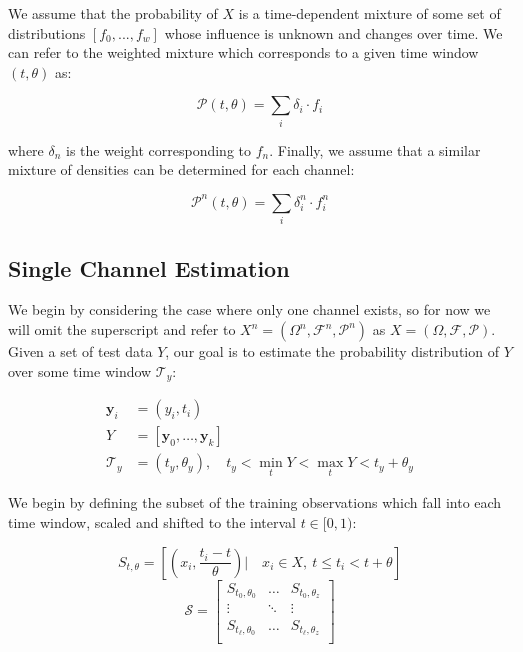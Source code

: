 \documentclass[10pt]{article}
\begin{document}
We assume that the probability of \(X \) is a time-dependent mixture of some set of distributions \( [f_0,...,f_w] \) whose influence is unknown and changes over time.  We can refer to the weighted mixture which corresponds to a given time window \( (t,\theta) \) as:

\begin{equation} \mathcal{P}(t,\theta) = \sum_i \delta_i \cdot f_i \end{equation}

where \( \delta_n \) is the weight corresponding to \( f_n \).  Finally, we assume that a similar mixture of densities can be determined for each channel:

\begin{equation} \mathcal{P}^n(t,\theta) = \sum_i \delta_i^n \cdot f_i^n \end{equation}

\subsection{Single Channel Estimation}
We begin by considering the case where only one channel exists, so for now we will omit the superscript and refer to \(X^n = (\Omega^n,\mathcal{F}^n,\mathcal{P}^n) \) as \(X = (\Omega, \mathcal{F},\mathcal{P}) \).  Given a set of test data \( Y \), our goal is to estimate the probability distribution of \( Y \) over some time window \( \mathcal{T}_y \):

\begin{align*}
\mathbf{y}_i &= (y_i,t_i) \\
 Y &= [ \mathbf{y}_0,\hdots,\mathbf{y}_k ] \\
 \mathcal{T}_y &= (t_y, \theta_y ), \quad t_y < \min_t Y < \max_t Y < t_y + \theta_y 
\end{align*}

We begin by defining the subset of the training observations which fall into each time window, scaled and shifted to the interval \( t \in [0,1) \):

\begin{equation} S_{t,\theta} = \left[ \left( x_i,\frac{t_i - t}{\theta} \right) \Big| \quad x_i \in X, \ t \le t_i < t+\theta \right] \end{equation}
\[ \mathcal{S} = 
\begin{bmatrix} 
S_{t_0,\theta_0} & \hdots & S_{t_0,\theta_z} \\
\vdots & \ddots & \vdots \\
S_{t_\ell, \theta_0} & \hdots & S_{t_\ell, \theta_z} \\
\end{bmatrix}  
\]
\end{document}
